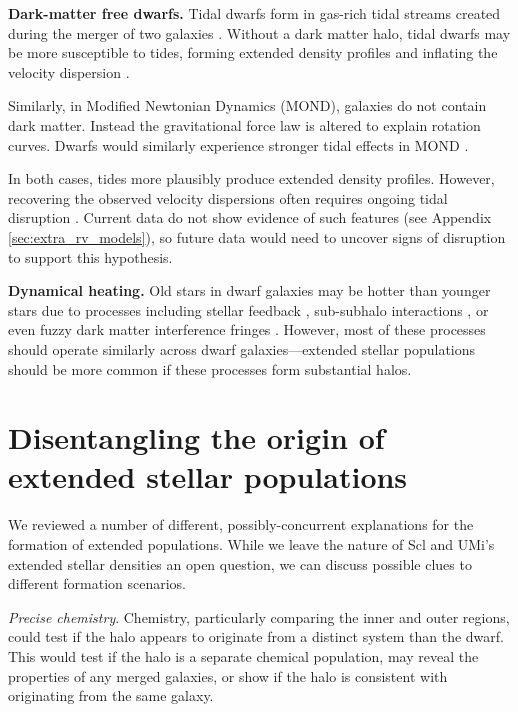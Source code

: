 \textbf{Dark-matter free dwarfs.} Tidal dwarfs form in gas-rich tidal
streams created during the merger of two galaxies
\citep[e.g.,][]{mirabel+dottori+lutz1992, bournaud+duc2006}. Without a
dark matter halo, tidal dwarfs may be more susceptible to tides, forming
extended density profiles and inflating the velocity dispersion
\citep{casas+2012, yang+2014, wang+2024a}.

Similarly, in Modified Newtonian Dynamics (MOND), galaxies do not
contain dark matter. Instead the gravitational force law is altered to
explain rotation curves. Dwarfs would similarly experience stronger
tidal effects in MOND \citep{mcgaugh+wolf2010, brada+milgrom2000}.

In both cases, tides more plausibly produce extended density profiles.
However, recovering the observed velocity dispersions often requires
ongoing tidal disruption
\citetext{\citealp{mcgaugh+wolf2010}; \citealp[but see
also][]{sanchez-salcedo+hernandez2007}}. Current data do not show
evidence of such features (see Appendix \ref{sec:extra_rv_models}), so
future data would need to uncover signs of disruption to support this
hypothesis.

\textbf{Dynamical heating.} Old stars in dwarf galaxies may be hotter
than younger stars due to processes including stellar feedback
\citep{stinson+2009, maxwell+2012, el-badry+2016, mercado+2021},
sub-subhalo interactions \citep{penarrubia+2025}, or even fuzzy dark
matter interference fringes
\citep[e.g.,][]{el-zant+2020, duttachowdhury+2023}. However, most of
these processes should operate similarly across dwarf
galaxies---extended stellar populations should be more common if these
processes form substantial halos.

\section{Disentangling the origin of extended stellar
populations}\label{disentangling-the-origin-of-extended-stellar-populations}

We reviewed a number of different, possibly-concurrent explanations for
the formation of extended populations. While we leave the nature of Scl
and UMi's extended stellar densities an open question, we can discuss
possible clues to different formation scenarios.

\emph{Precise chemistry}. Chemistry, particularly comparing the inner
and outer regions, could test if the halo appears to originate from a
distinct system than the dwarf. This would test if the halo is a
separate chemical population, may reveal the properties of any merged
galaxies, or show if the halo is consistent with originating from the
same galaxy.

